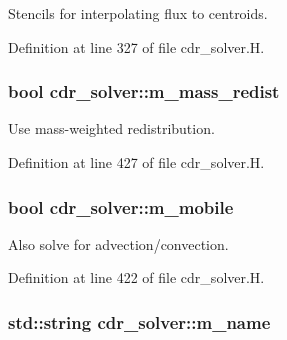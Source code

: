 Stencils for interpolating flux to centroids. 



Definition at line 327 of file cdr\+\_\+solver.\+H.

\subsubsection[{\texorpdfstring{m\+\_\+mass\+\_\+redist}{m_mass_redist}}]{\setlength{\rightskip}{0pt plus 5cm}bool cdr\+\_\+solver\+::m\+\_\+mass\+\_\+redist\hspace{0.3cm}{\ttfamily [protected]}}\hypertarget{classcdr__solver_aac342db383d9d907e262768444c6f647}{}\label{classcdr__solver_aac342db383d9d907e262768444c6f647}


Use mass-\/weighted redistribution. 



Definition at line 427 of file cdr\+\_\+solver.\+H.

\subsubsection[{\texorpdfstring{m\+\_\+mobile}{m_mobile}}]{\setlength{\rightskip}{0pt plus 5cm}bool cdr\+\_\+solver\+::m\+\_\+mobile\hspace{0.3cm}{\ttfamily [protected]}}\hypertarget{classcdr__solver_a30b3c7d43c7fcd45b06f4e6d4f0a7f80}{}\label{classcdr__solver_a30b3c7d43c7fcd45b06f4e6d4f0a7f80}


Also solve for advection/convection. 



Definition at line 422 of file cdr\+\_\+solver.\+H.

\subsubsection[{\texorpdfstring{m\+\_\+name}{m_name}}]{\setlength{\rightskip}{0pt plus 5cm}std\+::string cdr\+\_\+solver\+::m\+\_\+name\hspace{0.3cm}{\ttfamily [protected]}}\hypertarget{classcdr__solver_a2c1f204e0a67df5865f78166e3a4ed6b}{}\label{classcdr__solver_a2c1f204e0a67df5865f78166e3a4ed6b}


